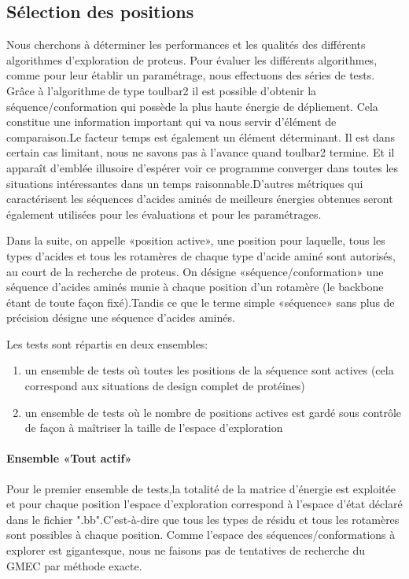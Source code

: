 \subsection{Sélection des positions}

Nous cherchons à déterminer les performances et les qualités des différents algorithmes d'exploration de proteus.
Pour évaluer les différents algorithmes, comme pour leur établir un paramétrage, nous effectuons des séries de tests. 
Grâce à l'algorithme de type toulbar2 il est possible d'obtenir la séquence/conformation qui possède la plus haute énergie de dépliement. Cela constitue une information important qui va nous servir d'élément de comparaison.Le facteur temps est également un élément déterminant. Il est dans certain cas limitant, nous ne savons pas à l'avance quand toulbar2 termine. Et il apparaît d'emblée illusoire d'espérer voir ce programme converger dans toutes les situations intéressantes dans un temps raisonnable.D'autres métriques qui caractérisent les séquences d'acides aminés de meilleurs énergies obtenues seront également utilisées pour les évaluations et pour les paramétrages.   

Dans la suite, on appelle «position active», une position pour laquelle, tous les types d'acides et tous les rotamères de chaque type d'acide aminé sont autorisés, au court de la recherche de proteus. On désigne «séquence/conformation» une séquence d'acides aminés munie à chaque position d'un rotamère (le backbone étant de toute façon fixé).Tandis ce que le terme simple «séquence»  sans plus de précision désigne une séquence d'acides aminés.

\label{sec:description_tests}
Les tests sont répartis en deux ensembles:
\begin{enumerate}
\item un ensemble de tests où toutes les positions de la séquence sont actives (cela correspond aux situations de design complet de protéines) 
\item un ensemble de tests où le nombre de positions actives est gardé sous contrôle de façon à maîtriser la taille de l'espace d'exploration
\end{enumerate}


\paragraph{Ensemble «Tout actif»}
\label{methode_TTactif}
Pour le premier ensemble de tests,la totalité de la matrice d'énergie est exploitée et pour chaque position l'espace d'exploration correspond à l'espace d'état déclaré dans le fichier ".bb".C'est-à-dire que tous les types de résidu et tous les rotamères sont possibles à chaque position.
Comme l'espace des séquences/conformations à explorer est gigantesque, nous ne faisons pas de tentatives de recherche du GMEC  par méthode exacte. 

